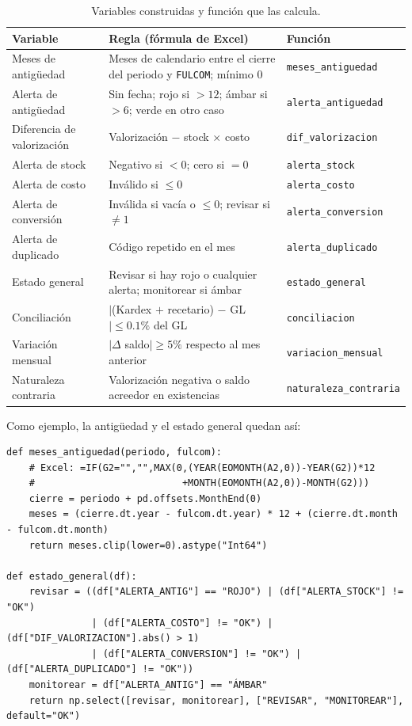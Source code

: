 \documentclass[11pt,letterpaper]{article}
\begin{document}
\begin{table}[h]
\centering\small
\begin{tabularx}{\textwidth}{@{}l L l@{}}
\toprule
Variable & Regla (fórmula de Excel) & Función \\
\midrule
Meses de antigüedad & Meses de calendario entre el cierre del periodo y \texttt{FULCOM}; mínimo 0 & \texttt{meses\_antiguedad} \\
Alerta de antigüedad & Sin fecha; rojo si $>12$; ámbar si $>6$; verde en otro caso & \texttt{alerta\_antiguedad} \\
Diferencia de valorización & Valorización $-$ stock $\times$ costo & \texttt{dif\_valorizacion} \\
Alerta de stock & Negativo si $<0$; cero si $=0$ & \texttt{alerta\_stock} \\
Alerta de costo & Inválido si $\le 0$ & \texttt{alerta\_costo} \\
Alerta de conversión & Inválida si vacía o $\le 0$; revisar si $\neq 1$ & \texttt{alerta\_conversion} \\
Alerta de duplicado & Código repetido en el mes & \texttt{alerta\_duplicado} \\
Estado general & Revisar si hay rojo o cualquier alerta; monitorear si ámbar & \texttt{estado\_general} \\
Conciliación & $|$(Kardex $+$ recetario) $-$ GL$| \le 0.1\%$ del GL & \texttt{conciliacion} \\
Variación mensual & $|\Delta$ saldo$| \ge 5\%$ respecto al mes anterior & \texttt{variacion\_mensual} \\
Naturaleza contraria & Valorización negativa o saldo acreedor en existencias & \texttt{naturaleza\_contraria} \\
\bottomrule
\end{tabularx}
\caption{Variables construidas y función que las calcula.}
\label{tab:formulas}
\end{table}

Como ejemplo, la antigüedad y el estado general quedan así:

\noindent\begin{minipage}{\linewidth}
\begin{lstlisting}
def meses_antiguedad(periodo, fulcom):
    # Excel: =IF(G2="","",MAX(0,(YEAR(EOMONTH(A2,0))-YEAR(G2))*12
    #                          +MONTH(EOMONTH(A2,0))-MONTH(G2)))
    cierre = periodo + pd.offsets.MonthEnd(0)
    meses = (cierre.dt.year - fulcom.dt.year) * 12 + (cierre.dt.month - fulcom.dt.month)
    return meses.clip(lower=0).astype("Int64")

def estado_general(df):
    revisar = ((df["ALERTA_ANTIG"] == "ROJO") | (df["ALERTA_STOCK"] != "OK")
               | (df["ALERTA_COSTO"] != "OK") | (df["DIF_VALORIZACION"].abs() > 1)
               | (df["ALERTA_CONVERSION"] != "OK") | (df["ALERTA_DUPLICADO"] != "OK"))
    monitorear = df["ALERTA_ANTIG"] == "ÁMBAR"
    return np.select([revisar, monitorear], ["REVISAR", "MONITOREAR"], default="OK")
\end{lstlisting}
\end{minipage}
\end{document}
